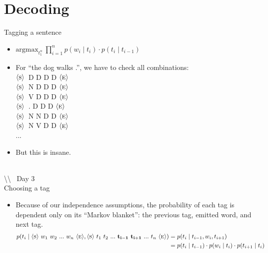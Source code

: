 \documentclass[11pt,letterpaper]{article}
\newcommand{\bs}{\textbackslash}
\newcommand{\ngramstart}{\ensuremath{\langle \textsc{s} \rangle}}
\newcommand{\ngramend}{\ensuremath{\langle \textsc{e} \rangle}}
\begin{document}
\section{Decoding}

Tagging a sentence

\begin{itemize}
  \item $\text{argmax}_{t_1^n}~\prod_{i=1}^n p(w_i \mid t_i) \cdot p(t_i \mid t_{i-1})$
  \item For ``the dog walks .'', we have to check all combinations: \vspace{2mm} \\
        \ngramstart\ D D D D \ngramend  \vspace{2mm} \\
        \ngramstart\ N D D D \ngramend  \vspace{2mm} \\
        \ngramstart\ V D D D \ngramend  \vspace{2mm} \\
        \ngramstart\ . D D D \ngramend  \vspace{2mm} \\
        \ngramstart\ N N D D \ngramend  \vspace{2mm} \\
        \ngramstart\ N V D D \ngramend  \vspace{2mm} \\
        ...
  \item But this is insane.
\end{itemize}



~\\ \bs\bs~ Day 3 \\

Choosing a tag

\begin{itemize}
  \item Because of our independence assumptions, the probability of each tag is dependent only on its ``Markov blanket'': the previous tag, emitted word, and next tag.  
    \begin{align*} p(t_i \mid \ngramstart~w_1~w_2~...~w_n~\ngramend, \ngramstart~t_1~t_2~...~\mathbf{t_{i-1}~t_{i+1}}~...~t_n~\ngramend)
       &= p(t_i \mid t_{i-1}, w_i, t_{i+1}) \\
       &= p(t_i \mid t_{i-1}) \cdot p(w_i \mid t_i) \cdot p(t_{i+1} \mid t_i)
    \end{align*}
\end{itemize}
\end{document}
